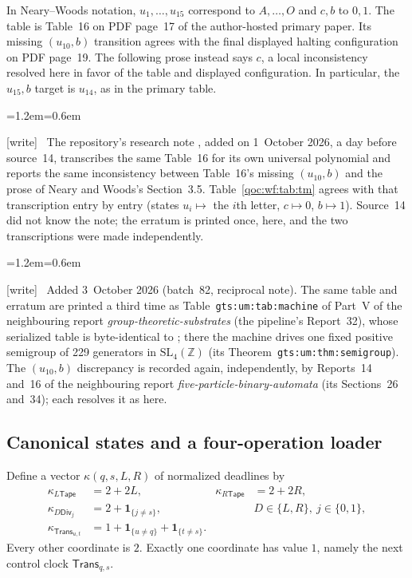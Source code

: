 \documentclass[11pt,letterpaper]{article}
\theoremstyle{definition}
\theoremstyle{remark}
\newcommand{\ind}[1]{\mathbf 1_{\{#1\}}}
\newcommand{\clk}[1]{\mathsf{#1}}
\newcommand{\cani}{\kappa}
\newcommand{\wtag}{\textup{[write]}}
\newenvironment{writenote}{\par\smallskip\begin{list}{}{\leftmargin=1.2em\rightmargin=0.6em}\item[]\small\wtag\ }{\end{list}\smallskip}
\newcommand{\lab}[1]{\nolinkurl{#1}}
\begin{document}
In Neary--Woods notation, $u_1,\ldots,u_{15}$ correspond to $A,\ldots,O$ and $c,b$ to $0,1$. The table is Table~16 on PDF page~17 of the author-hosted primary paper. Its missing $(u_{10},b)$ transition agrees with the final displayed halting configuration on PDF page~19. The following prose instead says $c$, a local inconsistency resolved here in favor of the table and displayed configuration. In particular, the $u_{15},b$ target is $u_{14}$, as in the primary table.

\begin{writenote}
The repository's research note , added on 1~October 2026, a day before source~14, transcribes the same Table~16 for its own universal polynomial and reports the same inconsistency between Table~16's missing $(u_{10},b)$ and the prose of Neary and Woods's Section~3.5. Table~\ref{qoc:wf:tab:tm} agrees with that transcription entry by entry (states $u_i\mapsto$ the $i$th letter, $c\mapsto0$, $b\mapsto1$). Source~14 did not know the note; the erratum is printed once, here, and the two transcriptions were made independently.
\end{writenote}

\begin{writenote}
Added 3~October 2026 (batch~82, reciprocal note). The same table and erratum are printed a third time as Table~\lab{gts:um:tab:machine} of Part~V of the neighbouring report \emph{group-theoretic-substrates} (the pipeline's Report~32), whose serialized table is byte-identical to ; there the machine drives one fixed positive semigroup of 229 generators in $\mathrm{SL}_4(\mathbb Z)$ (its Theorem~\lab{gts:um:thm:semigroup}). The $(u_{10},b)$ discrepancy is recorded again, independently, by Reports~14 and~16 of the neighbouring report \emph{five-particle-binary-automata} (its Sections~26 and~34); each resolves it as here.
\end{writenote}

\subsection{Canonical states and a four-operation loader}
Define a vector $\cani(q,s,L,R)$ of normalized deadlines by
\begin{align}
 \cani_{L\clk{Tape}}&=2+2L,& \cani_{R\clk{Tape}}&=2+2R,\label{qoc:wf:eq:canon-tapes}\\
 \cani_{D\clk{Div}_j}&=2+\ind{j\ne s},&&D\in\{L,R\},\ j\in\{0,1\},\label{qoc:wf:eq:canon-div}\\
 \cani_{\clk{Trans}_{u,t}}&=1+\ind{u\ne q}+\ind{t\ne s}.\label{qoc:wf:eq:canon-control}
\end{align}
Every other coordinate is $2$. Exactly one coordinate has value $1$, namely the next control clock $\clk{Trans}_{q,s}$.
\end{document}
